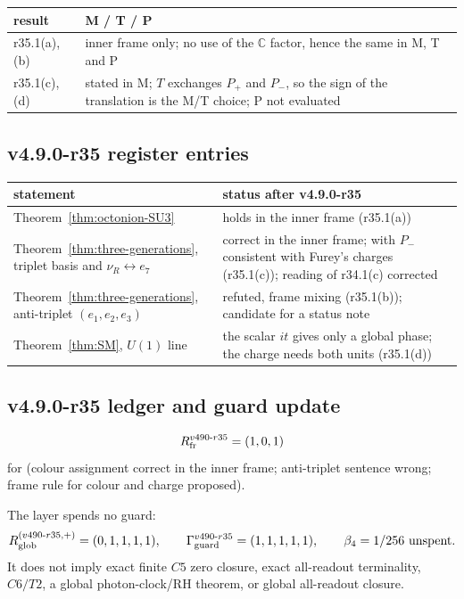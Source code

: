 \begin{center}
\small
\begin{tabular}{@{}>{\raggedright\arraybackslash}p{}>{\raggedright\arraybackslash}p{}@{}}
\toprule
result & M / T / P\\
\midrule
r35.1(a), (b) & inner frame only; no use of the \(\mathbb C\) factor, hence the same in M, T and P\\
r35.1(c), (d) & stated in M; \(T\) exchanges \(P_+\) and \(P_-\), so the sign of the translation is the M/T choice; P not evaluated\\
\bottomrule
\end{tabular}
\end{center}

\subsection*{v4.9.0-r35 register entries}
\label{subsec:v490-r35-register}

\begin{center}
\small
\begin{tabular}{@{}>{\raggedright\arraybackslash}p{}>{\raggedright\arraybackslash}p{}@{}}
\toprule
statement & status after v4.9.0-r35\\
\midrule
Theorem~\ref{thm:octonion-SU3} & holds in the inner frame (r35.1(a))\\
Theorem~\ref{thm:three-generations}, triplet basis and \(\nu_R\leftrightarrow e_7\) & correct in the inner frame; with \(P_-\) consistent with Furey's charges (r35.1(c)); reading of r34.1(c) corrected\\
Theorem~\ref{thm:three-generations}, anti-triplet \((e_1,e_2,e_3)\) & refuted, frame mixing (r35.1(b)); candidate for a status note\\
Theorem~\ref{thm:SM}, \(U(1)\) line & the scalar \(it\) gives only a global phase; the charge needs both units (r35.1(d))\\
\bottomrule
\end{tabular}
\end{center}

\subsection*{v4.9.0-r35 ledger and guard update}
\label{subsec:v490-r35-ledger-guard}

\[
R_{\rm fr}^{v490\text{-}r35}=(1,0,1)
\]
for (colour assignment correct in the inner frame; anti-triplet sentence wrong; frame rule for colour and charge proposed).

The layer spends no guard:
\[
R_{\rm glob}^{(v490\text{-}r35,+)}=(0,1,1,1,1),
\qquad
\Gamma_{\rm guard}^{v490\text{-}r35}=(1,1,1,1,1),
\qquad
\beta_4=1/256\ \text{unspent}.
\]
It does not imply exact finite \(C5\) zero closure, exact all-readout terminality,
\(C6/T2\), a global photon-clock/RH theorem, or global all-readout closure.
